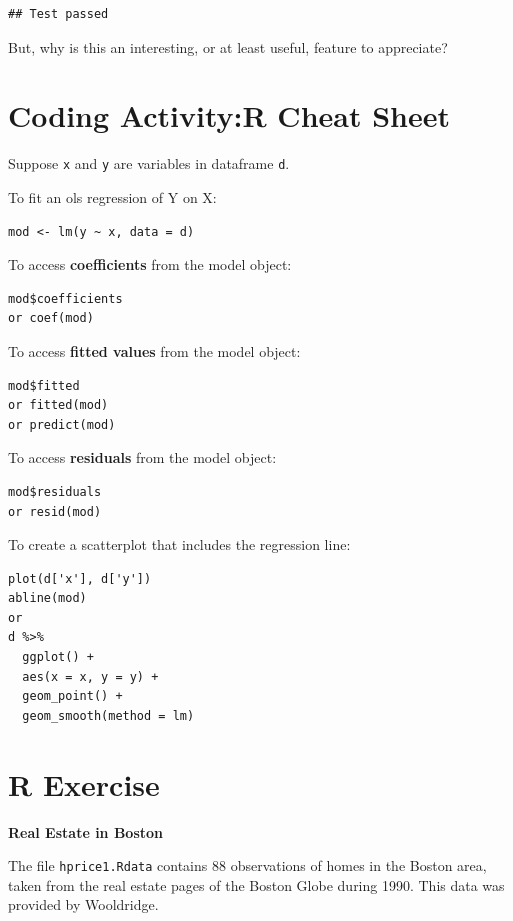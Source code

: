\documentclass[
]{book}
\theoremstyle{definition}
\theoremstyle{definition}
\theoremstyle{definition}
\theoremstyle{definition}
\theoremstyle{remark}
\begin{document}
\begin{verbatim}
## Test passed
\end{verbatim}

But, why is this an interesting, or at least useful, feature to appreciate?

\hypertarget{coding-activityr-cheat-sheet}{%
\section{Coding Activity:R Cheat Sheet}\label{coding-activityr-cheat-sheet}}

Suppose \texttt{x} and \texttt{y} are variables in dataframe \texttt{d}.

To fit an ols regression of Y on X:

\begin{verbatim}
mod <- lm(y ~ x, data = d)
\end{verbatim}

To access \textbf{coefficients} from the model object:

\begin{verbatim}
mod$coefficients
or coef(mod)
\end{verbatim}

To access \textbf{fitted values} from the model object:

\begin{verbatim}
mod$fitted
or fitted(mod)
or predict(mod)
\end{verbatim}

To access \textbf{residuals} from the model object:

\begin{verbatim}
mod$residuals
or resid(mod)
\end{verbatim}

To create a scatterplot that includes the regression line:

\begin{verbatim}
plot(d['x'], d['y'])
abline(mod)
or 
d %>% 
  ggplot() + 
  aes(x = x, y = y) + 
  geom_point() + 
  geom_smooth(method = lm)
\end{verbatim}

\hypertarget{r-exercise}{%
\section{R Exercise}\label{r-exercise}}

\textbf{Real Estate in Boston}

The file \texttt{hprice1.Rdata} contains 88 observations of homes in the Boston area, taken from the real estate pages of the Boston Globe during 1990. This data was provided by Wooldridge.
\end{document}
